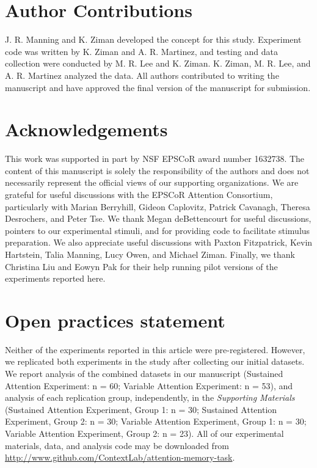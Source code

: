 \documentclass[english]{article}
\begin{document}
\section*{Author Contributions}

J. R. Manning and K. Ziman developed the concept for this study. Experiment code was written by K. Ziman and A. R. Martinez, and testing and data collection were conducted by M. R. Lee and K. Ziman. K. Ziman, M. R. Lee, and A. R. Martinez analyzed the data.  All authors contributed to writing the manuscript and have approved the final version of the manuscript for submission.


\section*{Acknowledgements}

This work was supported in part by NSF EPSCoR award number 1632738.  The content of this manuscript is solely the responsibility of the authors and does not necessarily represent the official views of our supporting organizations.  We are grateful for useful discussions with the EPSCoR Attention Consortium, particularly with Marian Berryhill, Gideon Caplovitz, Patrick Cavanagh, Theresa Desrochers, and Peter Tse.  We thank Megan deBettencourt for useful discussions, pointers to our experimental stimuli, and for providing code to facilitate stimulus preparation.  We also appreciate useful discussions with Paxton Fitzpatrick, Kevin Hartstein, Talia Manning, Lucy Owen, and Michael Ziman.  Finally, we thank Christina Liu and Eowyn Pak for their help running pilot versions of the experiments reported here.


\section*{Open practices statement}
Neither of the experiments reported in this article were pre-registered. However, we replicated both experiments in the study after collecting our initial datasets. We report analysis of the combined datasets in our manuscript (Sustained Attention Experiment: n = 60; Variable Attention Experiment: n = 53), and analysis of each replication group, independently, in the \textit{Supporting Materials} (Sustained Attention Experiment, Group 1: n = 30; Sustained Attention Experiment, Group 2: n = 30; Variable Attention Experiment, Group 1: n = 30; Variable Attention Experiment, Group 2: n = 23). All of our experimental materials, data, and analysis code may be downloaded from \url{http://www.github.com/ContextLab/attention-memory-task}.





\end{document}
